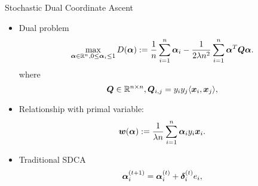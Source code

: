 \begin{frame}{Stochastic Dual Coordinate Ascent}
    \begin{itemize}
        \item Dual problem
            \[
                \max_{\bm{\alpha}\in \mathbb{R}^n, 0\le\bm{\alpha}_i\le 1} D(\bm{\alpha}):=\frac1n \sum_{i=1}^n \bm{\alpha}_i-\frac{1}{2\lambda n^2}\sum_{i=1}^n \bm{\alpha}^T\bm{Q}\bm{\alpha}.
            \]
            where 
            \[
                 \bm{Q}\in \mathbb{R}^{n\times n}, \bm{Q}_{i,j}=y_iy_j\langle \bm{x}_i, \bm{x}_j\rangle,
            \]
        \item Relationship with primal variable: 
            \[ 
                 \bm{w}(\bm{\alpha}) := \frac{1}{\lambda n} \sum_{i=1}^n \bm{\alpha}_i y_i \bm{x}_i.
            \]
        \item Traditional SDCA
            \[
                 \bm{\alpha}_i^{(t+1)} = \bm{\alpha}_i^{(t)} + \bm{\delta}_i^{(t)}e_i,
            \]
    \end{itemize}
\end{frame}
